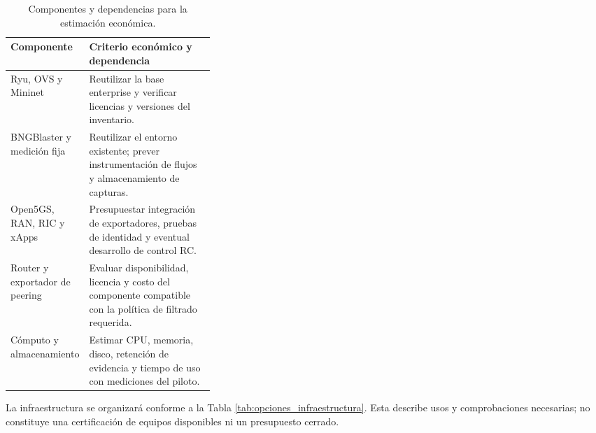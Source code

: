 \begin{table}[H]
    \centering
    \renewcommand{\arraystretch}{1.25}
    \fontsize{10}{12}\selectfont
    \begin{tabular}{@{}>{\raggedright\arraybackslash}p{0.34\linewidth}
        >{\raggedright\arraybackslash}p{}@{}}
        \hline \textbf{Componente} & \textbf{Criterio económico y dependencia} \\ \hline
        Ryu, OVS y Mininet & Reutilizar la base enterprise y verificar licencias y versiones del inventario. \\ \hline
        BNGBlaster y medición fija & Reutilizar el entorno existente; prever instrumentación de flujos y almacenamiento de capturas. \\ \hline
        Open5GS, RAN, RIC y xApps & Presupuestar integración de exportadores, pruebas de identidad y eventual desarrollo de control RC. \\ \hline
        Router y exportador de peering & Evaluar disponibilidad, licencia y costo del componente compatible con la política de filtrado requerida. \\ \hline
        Cómputo y almacenamiento & Estimar CPU, memoria, disco, retención de evidencia y tiempo de uso con mediciones del piloto. \\ \hline
    \end{tabular}
    \caption{Componentes y dependencias para la estimación económica.}
    \label{tab:componentes_tecnologicos}
\end{table}

La infraestructura se organizará conforme a la Tabla \ref{tab:opciones_infraestructura}. Esta describe usos y comprobaciones necesarias; no constituye una certificación de equipos disponibles ni un presupuesto cerrado.

